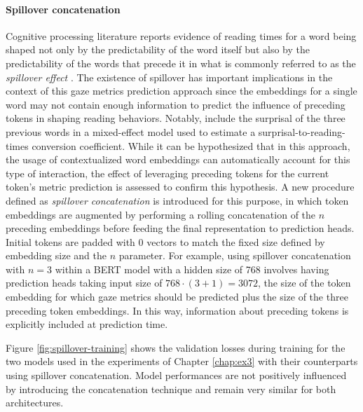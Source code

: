 \documentclass[a4paper, nobind]{templates/ociamthesis}
\begin{document}
\paragraph{Spillover concatenation} Cognitive processing literature reports evidence of reading times for a word being shaped not only by the predictability of the word itself but also by the predictability of the words that precede it \autocite{smith-levy-2013-effect} in what is commonly referred to as the \emph{spillover effect} \autocite{mitchell-1984-evaluation}. The existence of spillover has important implications in the context of this gaze metrics prediction approach since the embeddings for a single word may not contain enough information to predict the influence of preceding tokens in shaping reading behaviors. Notably, \textcite{schjindel-linzen-2020-single} include the surprisal of the three previous words in a mixed-effect model used to estimate a surprisal-to-reading-times conversion coefficient. While it can be hypothesized that in this approach, the usage of contextualized word embeddings can automatically account for this type of interaction, the effect of leveraging preceding tokens for the current token's metric prediction is assessed to confirm this hypothesis. A new procedure defined as \emph{spillover concatenation} is introduced for this purpose, in which token embeddings are augmented by performing a rolling concatenation of the \(n\) preceding embeddings before feeding the final representation to prediction heads. Initial tokens are padded with \(0\) vectors to match the fixed size defined by embedding size and the \(n\) parameter. For example, using spillover concatenation with \(n = 3\) within a BERT model with a hidden size of 768 involves having prediction heads taking input size of \(768 \cdot (3 + 1) = 3072\), the size of the token embedding for which gaze metrics should be predicted plus the size of the three preceding token embeddings. In this way, information about preceding tokens is explicitly included at prediction time.

Figure \ref{fig:spillover-training} shows the validation losses during training for the two models used in the experiments of Chapter \ref{chap:ex3} with their counterparts using spillover concatenation. Model performances are not positively influenced by introducing the concatenation technique and remain very similar for both architectures.
\end{document}
